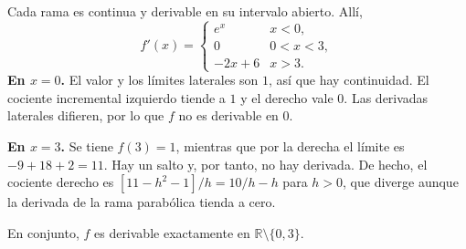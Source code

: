 Cada rama es continua y derivable en su intervalo abierto. Allí,
\[
f'(x)=
\begin{cases}
e^x & x<0,\\
0 & 0<x<3,\\
-2x+6 & x>3.
\end{cases}
\]
\textbf{En $x=0$.} El valor y los límites laterales son $1$, así que hay continuidad. El cociente incremental izquierdo tiende a $1$ y el derecho vale $0$. Las derivadas laterales difieren, por lo que $f$ no es derivable en $0$.

\textbf{En $x=3$.} Se tiene $f(3)=1$, mientras que por la derecha el límite es $-9+18+2=11$. Hay un salto y, por tanto, no hay derivada. De hecho, el cociente derecho es $[11-h^2-1]/h=10/h-h$ para $h>0$, que diverge aunque la derivada de la rama parabólica tienda a cero.

En conjunto, $f$ es derivable exactamente en $\mathbb R\setminus\{0,3\}$.
